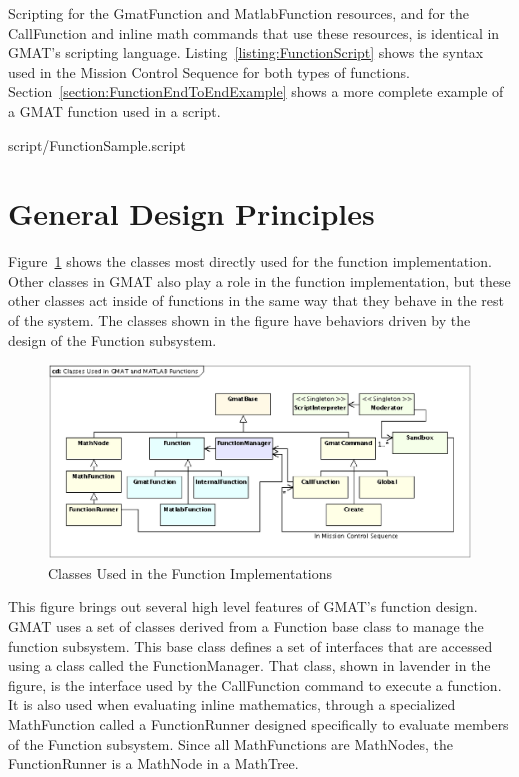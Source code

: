 Scripting for the GmatFunction and MatlabFunction resources, and for the CallFunction and inline
math commands that use these resources, is identical in GMAT's scripting language.
Listing~\ref{listing:FunctionScript} shows the syntax used in the Mission Control Sequence for both
types of functions.  Section~\ref{section:FunctionEndToEndExample} shows a more complete example of
a GMAT function used in a script.

\lstset{numbers=left}

{script/FunctionSample.script}
\lstset{numbers=none}

\section{General Design Principles}

Figure~\ref{figure:ClassesUsedInFunctions} shows the classes most directly used for the function
implementation.  Other classes in GMAT also play a role in the function implementation, but these
other classes act inside of functions in the same way that they behave in the rest of the system. 
The classes shown in the figure have behaviors driven by the design of the Function subsystem.

\begin{figure}[htb]
\begin{center}
\includegraphics[scale=0.5]{Images/ClassesUsedinGMATandMATLABFunctions.eps}
\caption{\label{figure:ClassesUsedInFunctions}Classes Used in the Function Implementations}
\end{center}
\end{figure}

This figure brings out several high level features of GMAT's function design.  GMAT uses a set of
classes derived from a Function base class to manage the function subsystem.  This base class
defines a set of interfaces that are accessed using a class called the FunctionManager.  That
class, shown in lavender in the figure, is the interface used by the CallFunction command to
execute a function.  It is also used when evaluating inline mathematics, through a specialized
MathFunction called a FunctionRunner designed specifically to evaluate members of the Function
subsystem.  Since all MathFunctions are MathNodes, the FunctionRunner is a MathNode in a MathTree.

